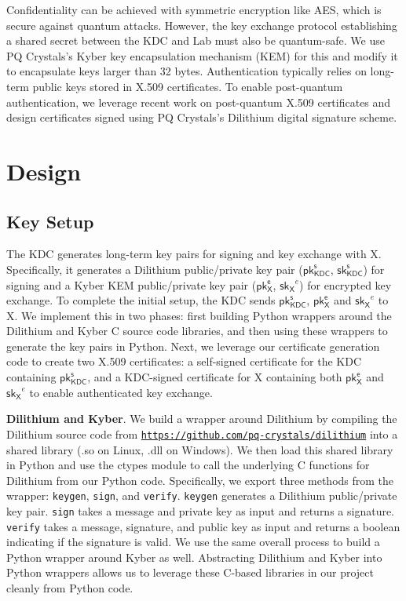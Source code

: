 \documentclass{article}
\begin{document}
Confidentiality can be achieved with symmetric encryption like AES, which is secure against quantum attacks. However, the key exchange protocol establishing a shared secret between the KDC and Lab must also be quantum-safe. We use PQ Crystals's Kyber key encapsulation mechanism (KEM) for this and modify it to encapsulate keys larger than 32 bytes. Authentication typically relies on long-term public keys stored in X.509 certificates. To enable post-quantum authentication, we leverage recent work on post-quantum X.509 certificates and design certificates signed using PQ Crystals's Dilithium digital signature scheme.

\section{Design}
\label{sec:design}

\subsection{Key Setup}
\label{sec:keysetup}

The KDC generates long-term key pairs for signing and key exchange with X. Specifically, it generates a Dilithium public/private key pair ($\mathsf{pk_{KDC}^s}$, $\mathsf{sk_{KDC}^s}$) for signing and a Kyber KEM public/private key pair ($\mathsf{pk_{X}^e}$, $\mathsf{sk_{X}}^e$) for encrypted key exchange. To complete the initial setup, the KDC sends $\mathsf{pk_{KDC}^s}$, $\mathsf{pk_{X}^e}$ and $\mathsf{sk_{X}}^e$ to X. We implement this in two phases: first building Python wrappers around the Dilithium and Kyber C source code libraries, and then using these wrappers to generate the key pairs in Python. Next, we leverage our certificate generation code to create two X.509 certificates: a self-signed certificate for the KDC containing $\mathsf{pk_{KDC}^s}$, and a KDC-signed certificate for X containing both $\mathsf{pk_{X}^e}$ and $\mathsf{sk_{X}}^e$ to enable authenticated key exchange.

\textbf{Dilithium and Kyber}. We build a wrapper around Dilithium by compiling the Dilithium source code from \href{https://github.com/pq-crystals/dilithium}{\texttt{https://github.com/pq-crystals/dilithium}} into a shared library (.so on Linux, .dll on Windows). We then load this shared library in Python and use the ctypes module to call the underlying C functions for Dilithium from our Python code. Specifically, we export three methods from the wrapper: \texttt{keygen}, \texttt{sign}, and \texttt{verify}. \texttt{keygen} generates a Dilithium public/private key pair. \texttt{sign} takes a message and private key as input and returns a signature. \texttt{verify} takes a message, signature, and public key as input and returns a boolean indicating if the signature is valid. We use the same overall process to build a Python wrapper around Kyber as well. Abstracting Dilithium and Kyber into Python wrappers allows us to leverage these C-based libraries in our project cleanly from Python code.
\end{document}
